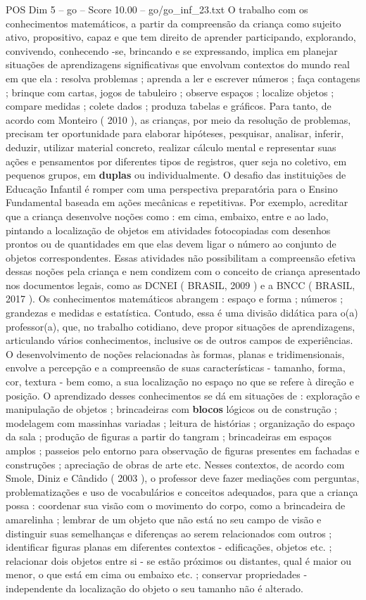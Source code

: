 \begin{textsample}{POS Dim 5 – go – Score 10.00 – go/go\_inf\_23.txt}
O trabalho com os conhecimentos matemáticos, a partir da compreensão da criança como sujeito ativo, propositivo, capaz e que tem direito de aprender participando, explorando, convivendo, conhecendo -se, brincando e se expressando, implica em planejar situações de aprendizagens significativas que envolvam contextos do mundo real em que ela : resolva problemas ; aprenda a ler e escrever números ; faça contagens ; brinque com cartas, jogos de tabuleiro ; observe espaços ; localize objetos ; compare medidas ; colete dados ; produza tabelas e gráficos.
Para tanto, de acordo com Monteiro ( 2010 ), as crianças, por meio da resolução de problemas, precisam ter oportunidade para elaborar hipóteses, pesquisar, analisar, inferir, deduzir, utilizar material concreto, realizar cálculo mental e representar suas ações e pensamentos por diferentes tipos de registros, quer seja no coletivo, em pequenos grupos, em \textbf{duplas} ou individualmente.
O desafio das instituições de Educação Infantil é romper com uma perspectiva preparatória para o Ensino Fundamental baseada em ações mecânicas e repetitivas.
Por exemplo, acreditar que a criança desenvolve noções como : em cima, embaixo, entre e ao lado, pintando a localização de objetos em atividades fotocopiadas com desenhos prontos ou de quantidades em que elas devem ligar o número ao conjunto de objetos correspondentes.
Essas atividades não possibilitam a compreensão efetiva dessas noções pela criança e nem condizem com o conceito de criança apresentado nos documentos legais, como as DCNEI ( BRASIL, 2009 ) e a BNCC ( BRASIL, 2017 ).
Os conhecimentos matemáticos abrangem : espaço e forma ; números ; grandezas e medidas e estatística.
Contudo, essa é uma divisão didática para o(a) professor(a), que, no trabalho cotidiano, deve propor situações de aprendizagens, articulando vários conhecimentos, inclusive os de outros campos de experiências.
O desenvolvimento de noções relacionadas às formas, planas e tridimensionais, envolve a percepção e a compreensão de suas características - tamanho, forma, cor, textura - bem como, a sua localização no espaço no que se refere à direção e posição.
O aprendizado desses conhecimentos se dá em situações de : exploração e manipulação de objetos ; brincadeiras com \textbf{blocos} lógicos ou de construção ; modelagem com massinhas variadas ; leitura de histórias ; organização do espaço da sala ; produção de figuras a partir do tangram ; brincadeiras em espaços amplos ; passeios pelo entorno para observação de figuras presentes em fachadas e construções ; apreciação de obras de arte etc.
Nesses contextos, de acordo com Smole, Diniz e Cândido ( 2003 ), o professor deve fazer mediações com perguntas, problematizações e uso de vocabulários e conceitos adequados, para que a criança possa : coordenar sua visão com o movimento do corpo, como a brincadeira de amarelinha ; lembrar de um objeto que não está no seu campo de visão e distinguir suas semelhanças e diferenças ao serem relacionados com outros ; identificar figuras planas em diferentes contextos - edificações, objetos etc. ; relacionar dois objetos entre si - se estão próximos ou distantes, qual é maior ou menor, o que está em cima ou embaixo etc. ; conservar propriedades - independente da localização do objeto o seu tamanho não é alterado.

\end{textsample}
